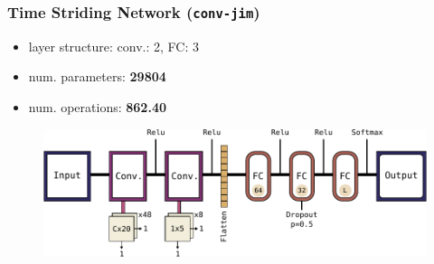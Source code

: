 \begin{frame}
  \frametitle{Time Striding Network (\texttt{conv-jim})}
  \begin{itemize}
    \item layer structure: conv.: 2, FC: 3
    \item num. parameters: \textbf{\num{29804}}
    \item num. operations: \textbf{\SI{862.40}{\kilo\ops}}
  \end{itemize}
  \begin{figure} \includegraphics[height=0.35\textheight]{../4_nn/figs/nn_arch_cnn_jim.pdf} \end{figure}
\end{frame}

